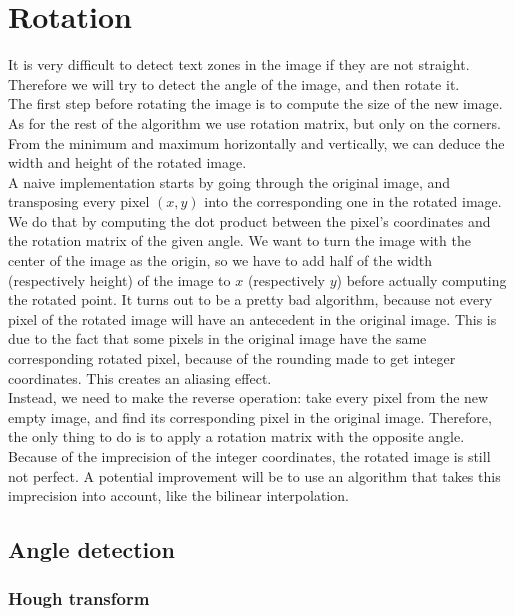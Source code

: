 \documentclass[12pt]{report}
\begin{document}
\section{Rotation}

It is very difficult to detect text zones in the image if they are not straight.
Therefore we will try to detect the angle of the image, and then
rotate it.\\

The first step before rotating the image is to compute the size of the new
image. As for the rest of the algorithm we use rotation matrix, but only on the
corners. From the minimum and maximum horizontally and vertically, we can deduce
the width and height of the rotated image.\\

A naive implementation starts by going through the original image, and
transposing every pixel $(x, y)$ into the corresponding one in the rotated
image. We do that by computing the dot product between the pixel's coordinates
and the rotation matrix of the given angle. We want to turn the image with the
center of the image as the origin, so we have to add half of the width
(respectively height) of the image to $x$ (respectively $y$) before actually
computing the rotated point. It turns out to be a pretty bad algorithm, because
not every pixel of the rotated image will have an antecedent in the original
image. This is due to the fact that some pixels in the original image have the
same corresponding rotated pixel, because of the rounding made to get integer
coordinates. This creates an aliasing effect.\\

Instead, we need to make the reverse operation: take every pixel from the new
empty image, and find its corresponding pixel in the original image. Therefore,
the only thing to do is to apply a rotation matrix with the opposite angle.\\

Because of the imprecision of the integer coordinates, the rotated image is
still not perfect. A potential improvement will be to use an algorithm that
takes this imprecision into account, like the bilinear interpolation.

\subsection{Angle detection}
\subsubsection{Hough transform}
\end{document}
